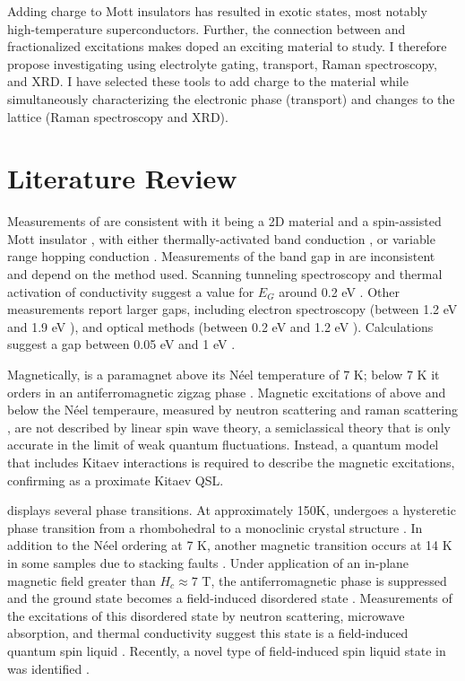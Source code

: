 \documentclass[11pt]{article}
\begin{document}
Adding charge to Mott insulators has resulted in exotic states, most notably high-temperature superconductors. Further, the connection between \rucl and fractionalized excitations makes doped \rucl an exciting material to study. I therefore propose investigating \rucl using electrolyte gating, transport, Raman spectroscopy, and XRD. I have selected these tools to add charge to the material while simultaneously characterizing the electronic phase (transport) and changes to the lattice (Raman spectroscopy and XRD).

\section{Literature Review}
Measurements of \rucl are consistent with it being a 2D material \cite{Kim2015a} and a spin-assisted Mott insulator \cite{Plumb2014}, with either thermally-activated band conduction \cite{Rojas1983}, or variable range hopping conduction \cite{Mashhadi2018}. Measurements of the band gap in \rucl are inconsistent and depend on the method used. Scanning tunneling spectroscopy and thermal activation of conductivity suggest a value for $E_{G}$ around 0.2 eV \cite{Binotto1971,Rojas1983,Ziatdinov2016}. Other measurements report larger gaps, including electron spectroscopy (between 1.2 eV and 1.9 eV \cite{Koitzsch2016,Zhou2016,Sinn2016}), and optical methods (between 0.2 eV and 1.2 eV \cite{Reschke2017,Pollini1996,Sandilands2016}). Calculations suggest a gap between 0.05 eV and 1 eV  \cite{Sarikurt2017,Kim2015}.

Magnetically, \rucl is a paramagnet above its N{\'e}el temperature of 7 K; below 7 K it orders in an antiferromagnetic zigzag phase \cite{Sears2015}. Magnetic excitations of \rucl above and below the N{\'e}el temperaure, measured by neutron scattering and raman scattering \cite{Banerjee2016,Sandilands2015}, are not described by linear spin wave theory, a semiclassical theory that is only accurate in the limit of weak quantum fluctuations.  Instead, a quantum model that includes Kitaev interactions is required to describe the magnetic excitations, confirming \rucl as a proximate Kitaev QSL.

\rucl displays several phase transitions. At approximately 150K, \rucl  undergoes a hysteretic phase transition from a rhombohedral to a monoclinic crystal structure \cite{Kubota2015,Ziatdinov2016,Glamazda2017,Reschke2017}. In addition to the N{\'e}el ordering at 7 K, another magnetic transition occurs at 14 K in some samples due to stacking faults \cite{Banerjee2016}. Under application of an in-plane magnetic field greater than $H_{c} \approx 7$ T, the antiferromagnetic phase is suppressed and the ground state becomes a field-induced disordered state \cite{Hentrich2017,Wolter2017,Banerjee2017,Wang2017,Baek2017}. Measurements of the excitations of this disordered state by neutron scattering, microwave absorption, and thermal conductivity suggest this state is a field-induced quantum spin liquid \cite{Banerjee2016,Wellm2017,Kasahara2018}. Recently, a novel type of field-induced spin liquid state in \rucl was identified \cite{Lampen-Kelley2018}.
\end{document}
